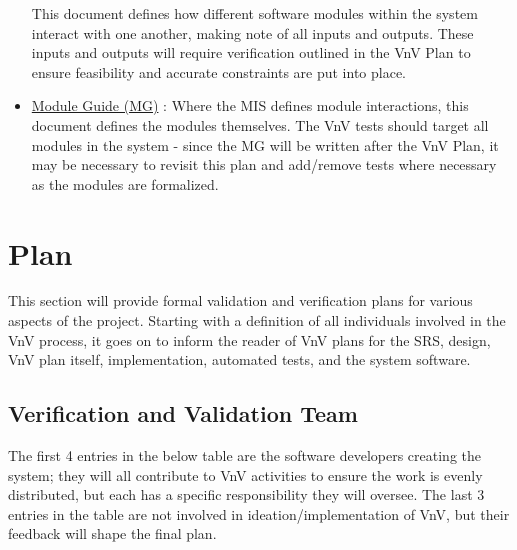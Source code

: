 \documentclass[12pt, titlepage]{article}
\begin{document}
\begin{itemize}
  This document defines how different software modules within the system interact with one another, making note of all inputs and outputs. These inputs 
  and outputs will require verification outlined in the VnV Plan to ensure feasibility and accurate constraints are put into place.
  \item \href{https://github.com/emilyperica/ScoreGen/blob/main/docs/Design/SoftArchitecture/MG.pdf}{Module Guide (MG)} \citep*{ScoreGenMG}:
  Where the MIS defines module interactions, this document defines the modules themselves. The VnV tests should target all modules in 
  the system - since the MG will be written after the VnV Plan, it may be necessary to revisit this plan and add/remove tests where necessary 
  as the modules are formalized.
\end{itemize}


\section{Plan}

This section will provide formal validation and verification plans for various aspects of the project. 
Starting with a definition of all individuals involved in the VnV process, it goes on to inform the 
reader of VnV plans for the SRS, design, VnV plan itself, implementation, automated tests, and the 
system software.

\subsection{Verification and Validation Team}

The first 4 entries in the below table are the software developers creating the system; they will all 
contribute to VnV activities to ensure the work is evenly distributed, but each has a specific responsibility 
they will oversee. The last 3 entries in the table are not involved in ideation/implementation of VnV, but 
their feedback will shape the final plan. \newpage
\end{document}
